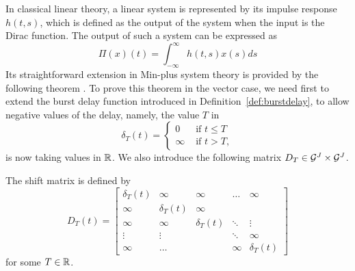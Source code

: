 
In classical linear theory, a linear system is represented by its impulse response $h(t,s)$, which is defined as the output of the system when the input is the Dirac function. The output of such a system can be expressed as
$$ \Pi(x)(t) = \int_{-\infty}^{\infty} h(t,s) x(s) ds $$
Its straightforward extension in Min-plus system theory is
provided by the following theorem \cite{maxPlus}. To prove this
theorem in the vector case, we need first to extend the burst
delay function introduced in Definition~\ref{def:burstdelay}, to
allow negative values of the delay, namely, the value $T$ in
$$
\delta_{T}(t)= \left\{  \begin{array}{ll}  0 & \mbox{ if } t \leq T \\
                       \infty & \mbox{ if } t > T,
\end{array}
\right.
$$
is now taking values in $\mathbb{R}$. We also introduce the following matrix $D_T \in \mathcal G^J \times \mathcal G^J$.





\begin{definition}
The  shift matrix is defined by
$$ D_{T}(t) = \left[ \begin{array}{ccccc} \delta_T(t) & \infty & \infty & \hdots & \infty \\
                              \infty & \delta_T(t) & \infty &  &  \\
                        \infty & \infty & \delta_T(t) & \ddots & \vdots \\
                        \vdots & \vdots &  & \ddots & \infty \\
                        \infty & \hdots & & \infty & \delta_T(t)  \end{array} \right] $$
for some $T \in \mathbb{R}$.
\end{definition}

